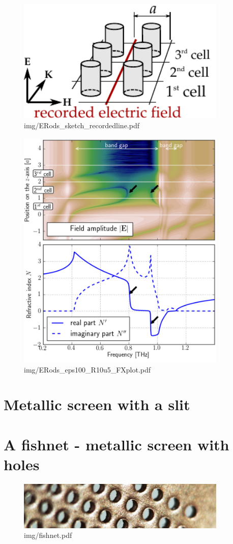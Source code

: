 \begin{figure} \caption{img/ERods\_sketch\_recordedline.pdf}  \centering  \includegraphics[width=10cm]{img/ERods_sketch_recordedline.pdf} \end{figure} \clearpage
\begin{figure} \caption{img/ERods\_eps100\_R10u5\_FXplot.pdf}  \centering \includegraphics[width=10cm]{img/ERods_eps100_R10u5_FXplot.pdf} \end{figure} \clearpage

\section{Metallic screen with a slit} %

\section{A fishnet - metallic screen with holes} %
\begin{figure} \caption{img/fishnet.pdf}  \centering \includegraphics[width=10cm]{img/fishnet.pdf} \end{figure} \clearpage

